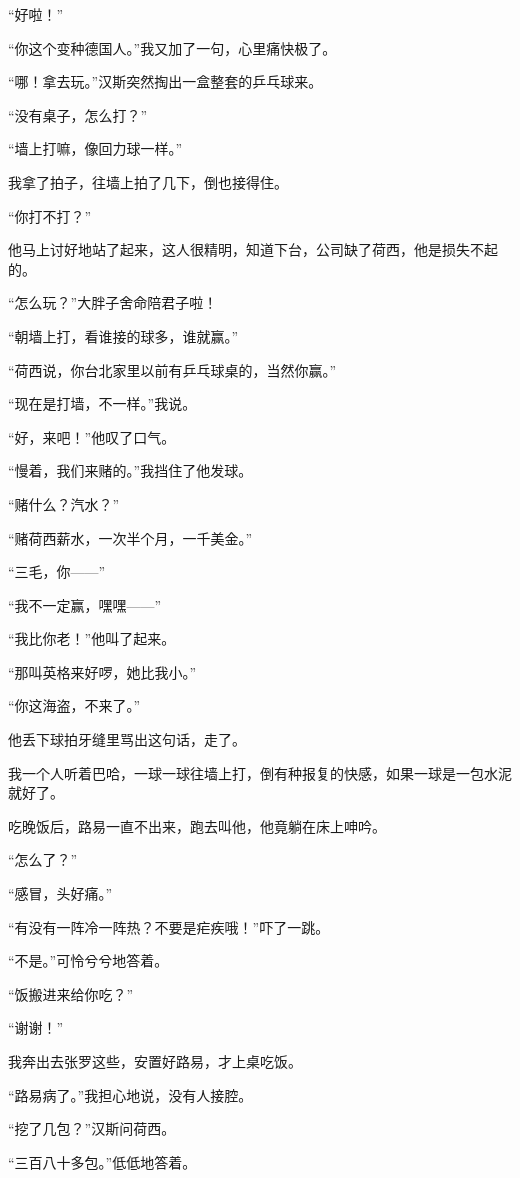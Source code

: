 \par “好啦！”
\par “你这个变种德国人。”我又加了一句，心里痛快极了。
\par “哪！拿去玩。”汉斯突然掏出一盒整套的乒乓球来。
\par “没有桌子，怎么打？”
\par “墙上打嘛，像回力球一样。”
\par 我拿了拍子，往墙上拍了几下，倒也接得住。
\par “你打不打？”
\par 他马上讨好地站了起来，这人很精明，知道下台，公司缺了荷西，他是损失不起的。
\par “怎么玩？”大胖子舍命陪君子啦！
\par “朝墙上打，看谁接的球多，谁就赢。”
\par “荷西说，你台北家里以前有乒乓球桌的，当然你赢。”
\par “现在是打墙，不一样。”我说。
\par “好，来吧！”他叹了口气。
\par “慢着，我们来赌的。”我挡住了他发球。
\par “赌什么？汽水？”
\par “赌荷西薪水，一次半个月，一千美金。”
\par “三毛，你——”
\par “我不一定赢，嘿嘿——”
\par “我比你老！”他叫了起来。
\par “那叫英格来好啰，她比我小。”
\par “你这海盗，不来了。”
\par 他丢下球拍牙缝里骂出这句话，走了。
\par 我一个人听着巴哈，一球一球往墙上打，倒有种报复的快感，如果一球是一包水泥就好了。
\par 吃晚饭后，路易一直不出来，跑去叫他，他竟躺在床上呻吟。
\par “怎么了？”
\par “感冒，头好痛。”
\par “有没有一阵冷一阵热？不要是疟疾哦！”吓了一跳。
\par “不是。”可怜兮兮地答着。
\par “饭搬进来给你吃？”
\par “谢谢！”
\par 我奔出去张罗这些，安置好路易，才上桌吃饭。
\par “路易病了。”我担心地说，没有人接腔。
\par “挖了几包？”汉斯问荷西。
\par “三百八十多包。”低低地答着。
